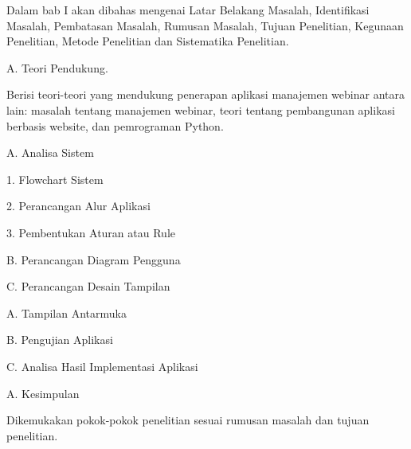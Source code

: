 \setlength{\leftskip}{4em}
\indent Dalam bab I akan dibahas mengenai Latar Belakang Masalah, Identifikasi Masalah, Pembatasan Masalah, Rumusan Masalah, Tujuan Penelitian, Kegunaan Penelitian, Metode Penelitian dan Sistematika Penelitian.

\setlength{\leftskip}{2em}

A. Teori Pendukung.

\setlength{\leftskip}{4em}
\indent Berisi teori-teori yang mendukung penerapan aplikasi manajemen webinar antara lain: masalah tentang manajemen webinar, teori tentang pembangunan aplikasi berbasis website, dan pemrograman Python.

\setlength{\leftskip}{2em}

A. Analisa Sistem

\setlength{\leftskip}{4em}
1. Flowchart Sistem

2. Perancangan Alur Aplikasi

3. Pembentukan Aturan atau Rule

\setlength{\leftskip}{2em}
B.  Perancangan Diagram Pengguna

C.  Perancangan Desain Tampilan

\setlength{\leftskip}{2em}

A. Tampilan Antarmuka

B.	Pengujian Aplikasi

C.	Analisa Hasil Implementasi Aplikasi

\setlength{\leftskip}{2em}

A. Kesimpulan

\setlength{\leftskip}{4em}
Dikemukakan pokok-pokok penelitian sesuai rumusan masalah dan tujuan penelitian.


